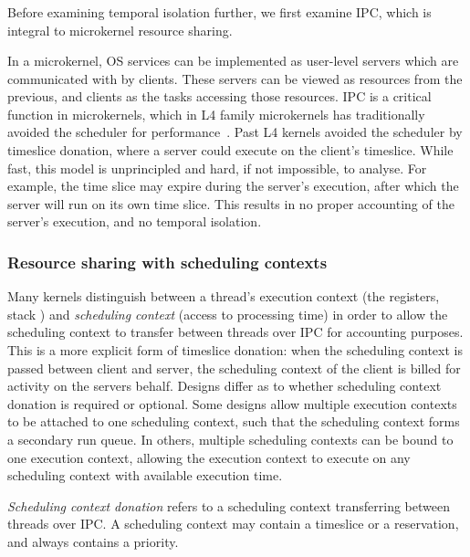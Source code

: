 \subsubsection{}

Before examining temporal isolation further, we first examine \gls{IPC}, which is integral to 
microkernel resource sharing. 

In a microkernel, \gls{OS} services can be implemented as user-level servers which are communicated
with by clients. These servers can be viewed as resources from the previous, and clients as the
tasks accessing those resources. \gls{IPC} is a critical function in microkernels, which in L4
family microkernels has traditionally avoided the scheduler for
performance~\citep{Heiser_Elphinstone_16}. Past L4 kernels avoided the scheduler by timeslice
donation, where a server could execute on the client's timeslice. While fast, this model is
unprincipled and hard, if not impossible, to analyse. For example, the time slice may expire during
the server's execution, after which the server will run on its own time slice.  This results in no
proper accounting of the server's execution, and no temporal isolation.

\subsubsection{Resource sharing with scheduling contexts}
\label{s:sc-intro}

Many kernels distinguish between a thread's execution context (the registers, stack \etc) and
\emph{scheduling context} (access to processing time) in order to allow the scheduling context to
transfer between threads over \gls{IPC} for accounting purposes.  This is a more explicit form of
timeslice donation: when the scheduling context is passed between client and server, the scheduling
context of the client is billed for activity on the servers behalf.  Designs differ as to whether
scheduling context donation is required or optional.  Some designs allow multiple execution contexts
to be attached to one scheduling context, such that the scheduling context forms a secondary run
queue.  In others, multiple scheduling contexts can be bound to one execution context, allowing the
execution context to execute on any scheduling context with available execution time. 

\emph{Scheduling context donation} refers to a scheduling context transferring between threads over
\gls{IPC}. A scheduling context may contain a timeslice or a reservation, and always contains a
priority.

